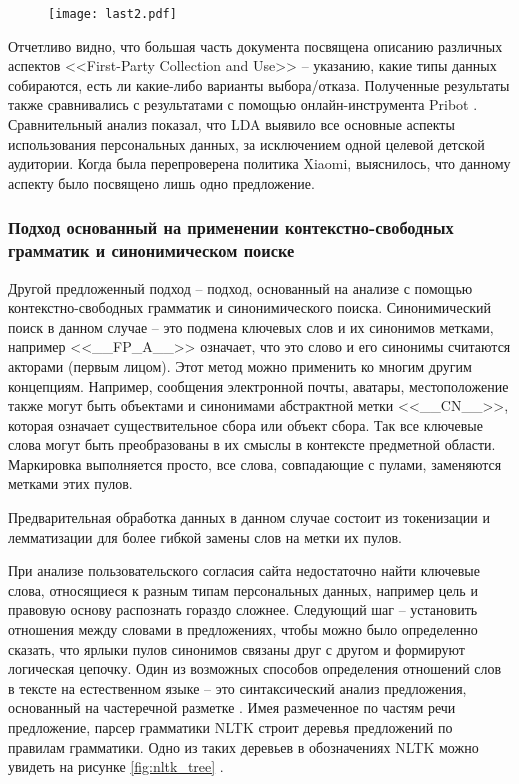 \documentclass[../main]{subfiles}
\begin{document}
\begin{figure}[H]
    \centering
    {\texttt{[image: last2.pdf]}}
    \vspace{-\baselineskip}
\end{figure}

Отчетливо видно, что большая часть документа посвящена описанию различных аспектов <<First-Party Collection and Use>> – указанию, какие типы данных собираются, есть ли какие-либо варианты выбора/отказа. Полученные результаты также сравнивались с результатами \cite{MDPI7} с помощью онлайн-инструмента Pribot \cite{Polisis}. Сравнительный анализ показал, что LDA выявило все основные аспекты использования персональных данных, за исключением одной целевой детской аудитории. Когда была перепроверена политика Xiaomi, выяснилось, что данному аспекту было посвящено лишь одно предложение.

\subsubsection{Подход основанный на применении контекстно-свободных грамматик и синонимическом поиске}

Другой предложенный подход -- подход, основанный на анализе с помощью контекстно-свободных грамматик и синонимического поиска. Синонимический поиск в данном случае -- это подмена ключевых слов и их синонимов метками, например <<\_\_FP\_A\_\_>> означает, что это слово и его синонимы считаются акторами (первым лицом). Этот метод можно применить ко многим другим концепциям. Например, сообщения электронной почты, аватары, местоположение также могут быть объектами и синонимами абстрактной метки <<\_\_CN\_\_>>, которая означает существительное сбора или объект сбора. Так все ключевые слова могут быть преобразованы в их смыслы в контексте предметной области. Маркировка выполняется просто, все слова, совпадающие с пулами, заменяются метками этих пулов.

Предварительная обработка данных в данном случае состоит из токенизации и лемматизации для более гибкой замены слов на метки их пулов.

При анализе пользовательского согласия сайта недостаточно найти ключевые слова, относящиеся к разным типам персональных данных, например цель и правовую основу распознать гораздо сложнее. Следующий шаг -- установить отношения между словами в предложениях, чтобы можно было определенно сказать, что ярлыки пулов синонимов связаны друг с другом и формируют логическая цепочку. Один из возможных способов определения отношений слов в тексте на естественном языке -- это синтаксический анализ предложения, основанный на частеречной разметке \cite{POS}. Имея размеченное по частям речи предложение, парсер грамматики NLTK \cite{NLTK} строит деревья предложений по правилам грамматики. Одно из таких деревьев в обозначениях NLTK можно увидеть на рисунке \ref{fig:nltk_tree} \cite{NLTK}.
\end{document}

